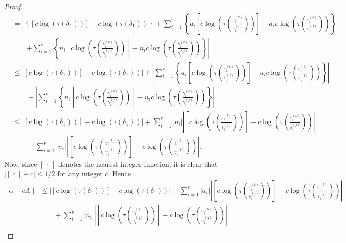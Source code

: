 \begin{proof}
\begin{align*}
	& = \left| \left\{ [c\log(\tau(\delta_1))] - c\log\left(\tau\left(\delta_1\right)\right)\right\} + \sum_{i = 1}^r \left\{a_i \left[c\log\left(\tau\left(\frac{\varepsilon_i^{(k)}}{\varepsilon_i^{(j)}}\right)\right)\right] - a_i c\log\left(\tau\left( \frac{\varepsilon_i^{(k)}}{\varepsilon_i^{(j)}}\right) \right)\right\} \right.\\
	& \quad \quad \left. + \sum_{i = 1}^{\nu} \left\{n_i \left[c\log\left(\tau\left(\frac{\gamma_i^{(k)}}{\gamma_i^{(j)}}\right)\right)\right] - n_i c\log \left(\tau\left( \frac{\gamma_i^{(k)}}{\gamma_i^{(j)}}\right)\right)\right\}\right|\\
	& \leq \left| [c\log(\tau(\delta_1))] - c\log\left(\tau\left(\delta_1\right)\right)\right| + \left|\sum_{i = 1}^r \left\{a_i \left[c\log\left(\tau\left(\frac{\varepsilon_i^{(k)}}{\varepsilon_i^{(j)}}\right)\right)\right] - a_i c\log\left(\tau\left( \frac{\varepsilon_i^{(k)}}{\varepsilon_i^{(j)}}\right) \right)\right\} \right| \\
	& \quad \quad + \left| \sum_{i = 1}^{\nu} \left\{n_i \left[c\log\left(\tau\left(\frac{\gamma_i^{(k)}}{\gamma_i^{(j)}}\right)\right)\right] - n_i c\log \left(\tau\left( \frac{\gamma_i^{(k)}}{\gamma_i^{(j)}}\right)\right)\right\}\right|\\
	& \leq \left| [c\log(\tau(\delta_1))] - c\log\left(\tau\left(\delta_1\right)\right)\right| + \sum_{i = 1}^r |a_i|\left| \left[c\log\left(\tau\left(\frac{\varepsilon_i^{(k)}}{\varepsilon_i^{(j)}}\right)\right)\right] - c\log\left(\tau\left( \frac{\varepsilon_i^{(k)}}{\varepsilon_i^{(j)}}\right) \right)\right| \\
	& \quad \quad +  \sum_{i = 1}^{\nu} |n_i|\left| \left[c\log\left(\tau\left(\frac{\gamma_i^{(k)}}{\gamma_i^{(j)}}\right)\right)\right] - c\log \left(\tau\left( \frac{\gamma_i^{(k)}}{\gamma_i^{(j)}}\right)\right)\right|.
\end{align*}
Now, since $[ \ \cdot \ ]$ denotes the nearest integer function, it is clear that $|[ \ c \ ] - c| \leq 1/2$ for any integer $c$. Hence
\begin{align*}
|\alpha-c\Lambda_\tau|
	& \leq \left| [c\log(\tau(\delta_1))] - c\log\left(\tau\left(\delta_1\right)\right)\right| + \sum_{i = 1}^r |a_i|\left| \left[c\log\left(\tau\left(\frac{\varepsilon_i^{(k)}}{\varepsilon_i^{(j)}}\right)\right)\right] - c\log\left(\tau\left( \frac{\varepsilon_i^{(k)}}{\varepsilon_i^{(j)}}\right) \right)\right| \\
	& \quad \quad +  \sum_{i = 1}^{\nu} |n_i|\left| \left[c\log\left(\tau\left(\frac{\gamma_i^{(k)}}{\gamma_i^{(j)}}\right)\right)\right] - c\log \left(\tau\left( \frac{\gamma_i^{(k)}}{\gamma_i^{(j)}}\right)\right)\right|\\

\end{align*}
\end{proof}
